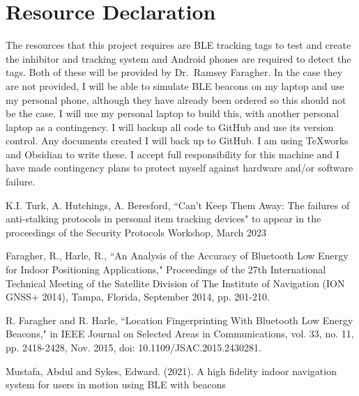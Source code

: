 \documentclass{article}
\begin{document}
\section{Resource Declaration}

The resources that this project requires are BLE tracking tags to test and create the inhibitor and tracking system and
Android phones are required to detect the tags.
Both of these will be provided by Dr.~Ramsey Faragher.
In the case they are not provided, I will be able to simulate BLE beacons on my laptop and use my personal phone, although they have already been ordered so this should not be the case.
I will use my personal laptop to build this, with another personal laptop as a contingency. I will backup all code to GitHub and use its version control. Any documents created I will back up to GitHub. I am using TeXworks and Obsidian to write these.
I accept full responsibility for this machine and I have made contingency plans to protect myself against hardware and/or software failure.

\begin{thebibliography}{9}
\frenchspacing
{} K.I. Turk, A. Hutchings, A. Beresford, ``Can’t Keep Them Away: The failures of anti-stalking protocols in personal item tracking devices" to appear in the proceedings of the Security Protocols Workshop, March 2023

 Faragher, R., Harle, R., ``An Analysis of the Accuracy of Bluetooth Low Energy for Indoor Positioning Applications," Proceedings of the 27th International Technical Meeting of the Satellite Division of The Institute of Navigation (ION GNSS+ 2014), Tampa, Florida, September 2014, pp. 201-210.

R. Faragher and R. Harle, ``Location Fingerprinting With Bluetooth Low Energy Beacons," in IEEE Journal on Selected Areas in Communications, vol. 33, no. 11, pp. 2418-2428, Nov. 2015, doi: 10.1109/JSAC.2015.2430281.

 Mustafa, Abdul and Sykes, Edward. (2021). A high fidelity indoor navigation system for users in motion using BLE with beacons
\end{thebibliography}
\end{document}
